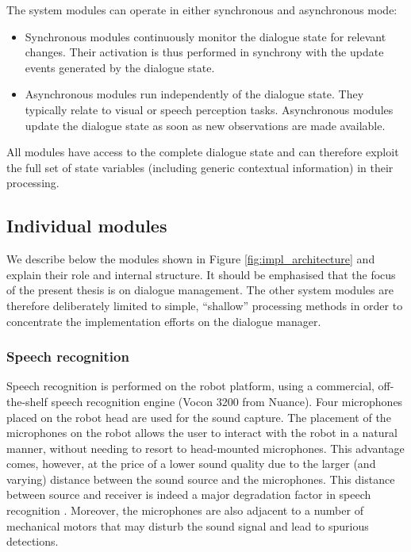 The system modules can operate in either synchronous and asynchronous mode: \begin{itemize}
\item Synchronous modules continuously monitor the dialogue state for relevant changes.  Their activation is thus performed in synchrony with the update events generated by the dialogue state.
\item Asynchronous modules run independently of the dialogue state.  They typically relate to visual or speech perception tasks. Asynchronous modules update the dialogue state as soon as new observations are made available. 

\end{itemize}

All modules have access to the complete dialogue state and can therefore exploit the full set of state variables (including generic contextual information) in their processing. 

\subsection{Individual modules}

We describe below the modules shown in Figure \ref{fig:impl_architecture} and explain their role and internal structure. It should be emphasised that the focus of the present thesis is on dialogue management.  The other system modules are therefore deliberately limited to simple, ``shallow'' processing methods in order to concentrate the implementation efforts on the dialogue manager. %

\subsubsection*{Speech recognition}

Speech recognition is performed on the robot platform, using a commercial, off-the-shelf speech recognition engine (Vocon 3200 from Nuance).  Four microphones placed on the robot head are used for the sound capture.  The placement of the microphones on the robot allows the user to interact with the robot in a natural manner, without needing to resort to head-mounted microphones. This advantage comes, however, at the price of a lower sound quality due to the larger (and varying) distance between the sound source and the microphones.   This distance between source and receiver is indeed a major degradation factor in speech recognition \citep{wolfel2009distant}. Moreover, the microphones are also adjacent to a number of mechanical motors that may disturb the sound signal and lead to spurious detections.

